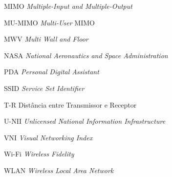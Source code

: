 \begin{siglas}
	\item[MIMO] \hspace{.8cm} \textit{Multiple-Input and Multiple-Output}
	\item[MU-MIMO] \hspace{.8cm} \textit{Multi-User} MIMO
	\item[MWV] \hspace{.8cm} \textit{Multi Wall and Floor}
	\item[NASA] \hspace{.8cm} \textit{National Aeronautics and Space Administration}
	\item[PDA] \hspace{.8cm} \textit{Personal Digital Assistant}
	\item[SSID] \hspace{.8cm} \textit{Service Set Identifier}
	\item[T-R] \hspace{.8cm} Distância entre Transmissor e Receptor
	\item[U-NII] \hspace{.8cm} \textit{Unlicensed National Information Infrastructure}
	\item[VNI] \hspace{.8cm} \textit{Visual Networking Index}
	\item[Wi-Fi] \hspace{.8cm} \textit{Wireless Fidelity}
	\item[WLAN] \hspace{.8cm} \textit{Wireless Local Area Network}
\end{siglas}